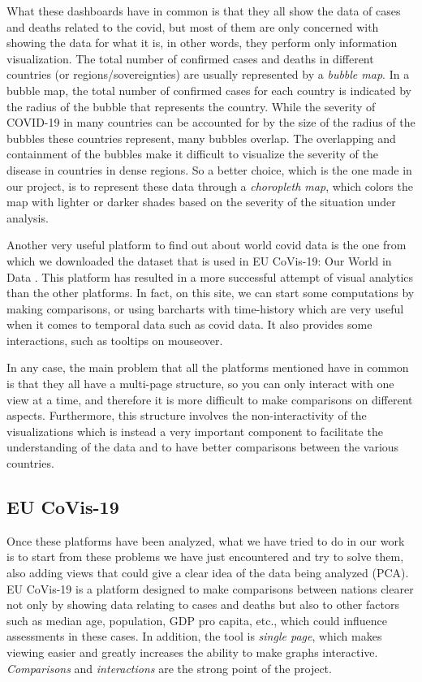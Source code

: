 \documentclass[10pt,conference]{IEEEtran}
\begin{document}
What these dashboards have in common is that they all show the data of cases and deaths related to the covid, but most of them are only 
concerned with showing the data for what it is, in other words, they perform only information visualization.
The total number of confirmed cases and deaths in different countries (or regions/sovereignties) are usually represented by a {\em bubble map}. 
In a bubble map, the total number of confirmed cases for each country is indicated by the radius of the bubble that represents the country. 
While the severity of COVID-19 in many countries can be accounted for by the size of the radius of the bubbles these countries represent, 
many bubbles overlap. The overlapping and containment of the bubbles make it difficult to visualize the severity of the disease 
in countries in dense regions.
So a better choice, which is the one made in our project, is to represent these data through a {\em choropleth map}, which colors the 
map with lighter or darker shades based on the severity of the situation under analysis.

Another very useful platform to find out about world covid data is the one from which we downloaded the dataset that is used in 
EU CoVis-19: Our World in Data \cite{vis9}. This platform has resulted in a more successful attempt of visual analytics than the other platforms. 
In fact, on this site, we can start some computations by making comparisons, or using barcharts with time-history which are very useful 
when it comes to temporal data such as covid data. It also provides some interactions, such as tooltips on mouseover. 

In any case, the main problem that all the platforms mentioned have in common is that they all have a multi-page structure, so you 
can only interact with one view at a time, and therefore it is more difficult to make comparisons on different aspects. Furthermore, 
this structure involves the non-interactivity of the visualizations which is instead a very important component to facilitate the 
understanding of the data and to have better comparisons between the various countries.

\subsection{EU CoVis-19}
Once these platforms have been analyzed, what we have tried to do in our work is to start from these problems we have just encountered 
and try to solve them, also adding views that could give a clear idea of the data being analyzed (PCA). EU CoVis-19 is a platform 
designed to make comparisons between nations clearer not only by showing data relating to cases and deaths but also to other factors 
such as median age, population, GDP pro capita, etc., which could influence assessments in these cases. In addition, the tool is 
{\em single page}, which makes viewing easier and greatly increases the ability to make graphs interactive. {\em Comparisons} and {\em interactions} are 
the strong point of the project.
\end{document}

